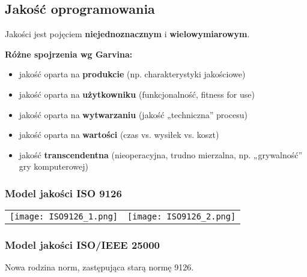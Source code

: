 \documentclass[../main.tex]{subfiles}
\begin{document}
    \subsection{Jakość oprogramowania}
    Jakości jest pojęciem \textbf{niejednoznacznym} i \textbf{wielowymiarowym}.

    \textbf{Różne spojrzenia wg Garvina:}
    \begin{itemize}
        \item jakość oparta na \textbf{produkcie} (np. charakterystyki jakościowe)
        \item jakość oparta na \textbf{użytkowniku} (funkcjonalność, fitness for use)
        \item jakość oparta na \textbf{wytwarzaniu} (jakość „techniczna” procesu)
        \item jakość oparta na \textbf{wartości} (czas vs. wysiłek vs. koszt)
        \item jakość \textbf{transcendentna} (nieoperacyjna, trudno mierzalna, np. „grywalność” gry komputerowej)
    \end{itemize}

    \subsubsection{Model jakości ISO 9126}

    \begin{table}[H]
        \begin{center}
            \begin{tabular}{ p{8cm} p{8cm}}
                \texttt{[image: ISO9126\_1.png]}
                &
                \texttt{[image: ISO9126\_2.png]}
            \end{tabular}
        \end{center}
    \end{table}

    \subsubsection{Model jakości ISO/IEEE 25000}
    Nowa rodzina norm, zastępująca starą normę 9126.
\end{document}
